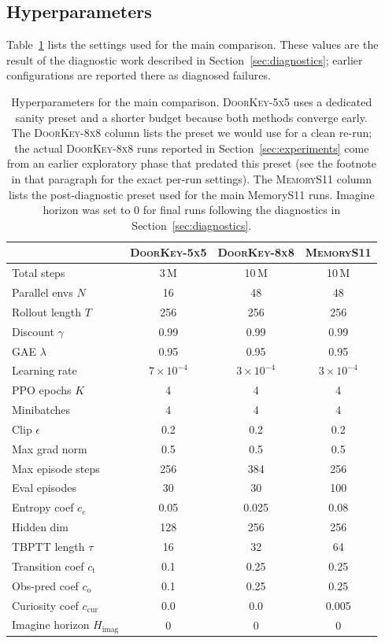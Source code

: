 \documentclass[letterpaper]{article}
\begin{document}
\subsection{Hyperparameters}

Table~\ref{tab:hparams} lists the settings used for the main comparison.
These values are the result of the diagnostic work described in
Section~\ref{sec:diagnostics}; earlier configurations are reported there
as diagnosed failures.

\begin{table}[!tbp]
\centering
\footnotesize
\setlength{\tabcolsep}{4pt}
\begin{tabular}{lccc}
\toprule
 & \textsc{DoorKey-5x5} & \textsc{DoorKey-8x8} & \textsc{MemoryS11} \\
\midrule
Total steps & 3\,M & 10\,M & 10\,M \\
Parallel envs $N$ & 16 & 48 & 48 \\
Rollout length $T$ & 256 & 256 & 256 \\
Discount $\gamma$ & 0.99 & 0.99 & 0.99 \\
GAE $\lambda$ & 0.95 & 0.95 & 0.95 \\
Learning rate & $7\!\times\!10^{-4}$ & $3\!\times\!10^{-4}$ & $3\!\times\!10^{-4}$ \\
PPO epochs $K$ & 4 & 4 & 4 \\
Minibatches & 4 & 4 & 4 \\
Clip $\epsilon$ & 0.2 & 0.2 & 0.2 \\
Max grad norm & 0.5 & 0.5 & 0.5 \\
Max episode steps & 256 & 384 & 256 \\
Eval episodes & 30 & 30 & 100 \\
Entropy coef $c_e$ & 0.05 & 0.025 & 0.08 \\
Hidden dim & 128 & 256 & 256 \\
TBPTT length $\tau$ & 16 & 32 & 64 \\
Transition coef $c_\text{t}$ & 0.1 & 0.25 & 0.25 \\
Obs-pred coef $c_\text{o}$ & 0.1 & 0.25 & 0.25 \\
Curiosity coef $c_\text{cur}$ & 0.0 & 0.0 & 0.005 \\
Imagine horizon $H_\text{imag}$ & 0 & 0 & 0 \\
\bottomrule
\end{tabular}
\caption{Hyperparameters for the main comparison. \textsc{DoorKey-5x5} uses a dedicated sanity preset and a shorter budget because both methods converge early. The \textsc{DoorKey-8x8} column lists the preset we would use for a clean re-run; the actual \textsc{DoorKey-8x8} runs reported in Section~\ref{sec:experiments} come from an earlier exploratory phase that predated this preset (see the footnote in that paragraph for the exact per-run settings). The \textsc{MemoryS11} column lists the post-diagnostic preset used for the main MemoryS11 runs. Imagine horizon was set to 0 for final runs following the diagnostics in Section~\ref{sec:diagnostics}.}
\label{tab:hparams}
\end{table}
\end{document}
